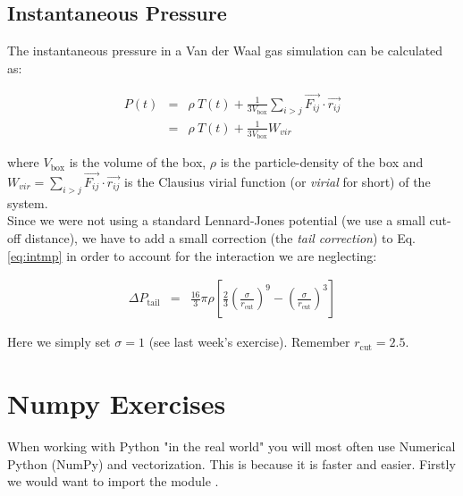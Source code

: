 \documentclass{article}
\begin{document}
\subsection{Instantaneous Pressure}

The instantaneous pressure in a Van der Waal gas simulation can be calculated
as:

\begin{eqnarray}
    P(t) & = & \rho \ T(t) + \frac{1}{3V_\mathrm{box}}  \sum_{i>j} \vec{F_{ij}} \cdot \vec{r_{ij}}\\
         & = & \rho \ T(t) + \frac{1}{3V_\mathrm{box}} W_{vir} \label{eq:intmp}
\end{eqnarray}

where $V_\mathrm{box}$ is the volume of the box, $\rho$ is the particle-density
of the box  and $W_{vir} = \sum_{i>j} \vec{F_{ij}} \cdot \vec{r_{ij}}$ is the
Clausius virial function (or \textit{virial} for short) of the system.\\

Since we were not using a standard Lennard-Jones potential (we use a small
cut-off distance), we have to add a small correction (the \textit{tail
correction}) to Eq. \ref{eq:intmp} in order to account for the interaction we are
neglecting:

\begin{eqnarray}
    \Delta P_\mathrm{tail} & = & \frac{16}{3}\pi \rho \left[ \frac{2}{3}\left( \frac{\sigma}{r_{\mathrm{cut}}} \right)^9 - \left(\frac{\sigma}{r_{\mathrm{cut}}} \right)^3 \right]
\end{eqnarray}

Here we simply set $\sigma = 1$ (see last week's exercise). Remember
$r_{\mathrm{cut}} = 2.5$.

\newpage

\section{Numpy Exercises}





When working with Python "in the real world" you will most often use Numerical
Python (NumPy) and vectorization.
This is because it is faster and easier.
Firstly we would want to import the module .
\end{document}
